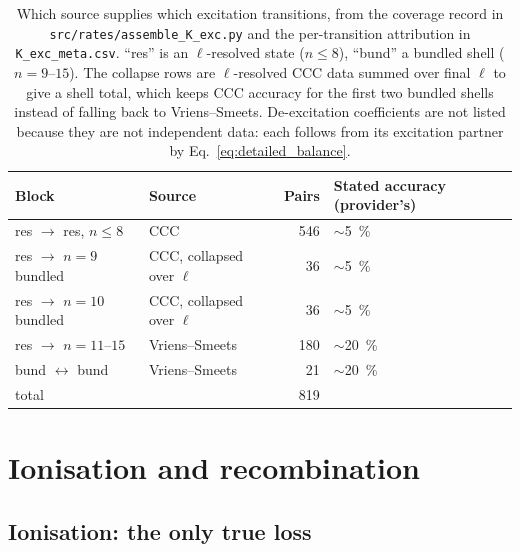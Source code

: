 \begin{table}[tbp]
  \centering
  \caption[Provenance of the excitation rate coefficients]{Which source supplies
  which excitation transitions, from the coverage record in
  \texttt{src/rates/assemble\_K\_exc.py} and the per-transition attribution in
  \texttt{K\_exc\_meta.csv}. ``res'' is an $\ell$-resolved state ($n \le 8$),
  ``bund'' a bundled shell ($n = 9$--$15$). The collapse rows are $\ell$-resolved
  CCC data summed over final $\ell$ to give a shell total, which keeps CCC
  accuracy for the first two bundled shells instead of falling back to
  Vriens--Smeets. De-excitation coefficients are not listed because they are not
  independent data: each follows from its excitation partner by
  Eq.~\eqref{eq:detailed_balance}.}
  \label{tab:exc_coverage}
  \begin{tabular}{llrl}
    \toprule
    Block & Source & Pairs & Stated accuracy (provider's) \\
    \midrule
    res $\to$ res, $n \le 8$      & CCC                        & 546 & $\sim$\SI{5}{\percent} \\
    res $\to$ $n=9$ bundled       & CCC, collapsed over $\ell$ &  36 & $\sim$\SI{5}{\percent} \\
    res $\to$ $n=10$ bundled      & CCC, collapsed over $\ell$ &  36 & $\sim$\SI{5}{\percent} \\
    res $\to$ $n=11$--$15$        & Vriens--Smeets             & 180 & $\sim$\SI{20}{\percent} \\
    bund $\leftrightarrow$ bund   & Vriens--Smeets             &  21 & $\sim$\SI{20}{\percent} \\
    \midrule
    total                         &                            & 819 & \\
    \bottomrule
  \end{tabular}
\end{table}

\section{Ionisation and recombination}
\label{sec:ion_recomb}

\subsection{Ionisation: the only true loss}

